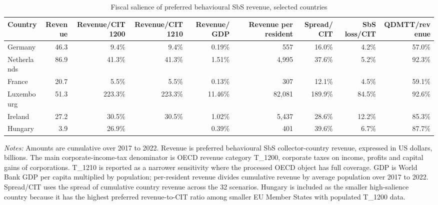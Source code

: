 \begin{table}[H]
\centering
\scriptsize
\caption[Fiscal salience of preferred behavioural SbS revenue]{Fiscal salience of preferred behavioural SbS revenue, selected countries}
\label{tab:country_fiscal_salience}
\begin{adjustbox}{max width=\textwidth,center}
\begin{tabular}{@{}lrrrrrrrr@{}}
\toprule
Country & Revenue & Revenue/CIT 1200 & Revenue/CIT 1210 & Revenue/GDP & Revenue per resident & Spread/CIT & SbS loss/CIT & QDMTT/revenue \\
\midrule
Germany & 46.3 &   9.4\% &   9.4\% &  0.19\% &    557 &  16.0\% &  4.2\% & 57.0\% \\
Netherlands & 86.9 &  41.3\% &  41.3\% &  1.51\% &  4,995 &  37.6\% &  5.2\% & 92.3\% \\
France & 20.7 &   5.5\% &   5.5\% &  0.13\% &    307 &  12.1\% &  4.5\% & 59.1\% \\
Luxembourg & 51.3 & 223.3\% & 223.3\% & 11.46\% & 82,081 & 189.9\% & 84.5\% & 92.6\% \\
Ireland & 27.2 &  30.5\% &  30.5\% &  1.02\% &  5,437 &  28.6\% & 12.2\% & 85.3\% \\
Hungary &  3.9 &  26.9\% &  &  0.39\% &    401 &  39.6\% &  6.7\% & 87.7\% \\
\bottomrule
\end{tabular}
\end{adjustbox}

\vspace{0.5em}
\begin{minipage}{0.96\textwidth}
\footnotesize\raggedright \textit{Notes:} Amounts are cumulative over 2017 to 2022. Revenue is preferred behavioural SbS collector-country revenue, expressed in US dollars, billions. The main corporate-income-tax denominator is OECD revenue category T\_1200, corporate taxes on income, profits and capital gains of corporations. T\_1210 is reported as a narrower sensitivity where the processed OECD object has full coverage. GDP is World Bank GDP per capita multiplied by population; per-resident revenue divides cumulative revenue by average population over 2017 to 2022. Spread/CIT uses the spread of cumulative country revenue across the 32 scenarios. Hungary is included as the smaller high-salience country because it has the highest preferred revenue-to-CIT ratio among smaller EU Member States with populated T\_1200 data.
\end{minipage}
\end{table}

